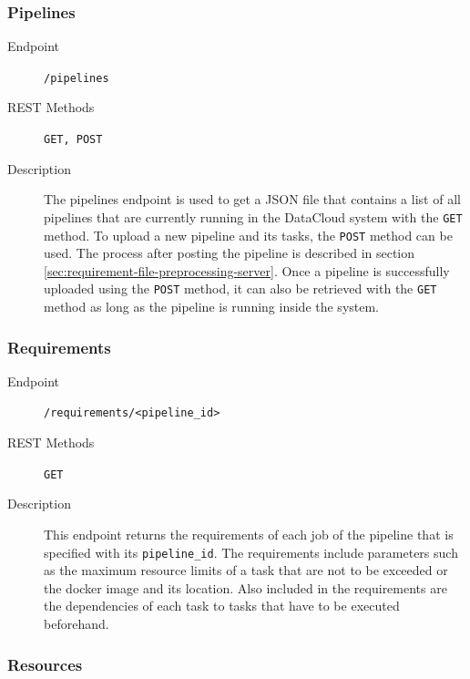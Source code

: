 \documentclass{article}
\begin{document}
            \subsubsection{Pipelines}
            
                \begin{description}
                    \item[Endpoint] \texttt{/pipelines}
                    \item[REST Methods] \texttt{GET, POST}
                    \item[Description] The pipelines endpoint is used to get a JSON file that contains a list of all pipelines that are currently running in the DataCloud system with the \texttt{GET} method. To upload a new pipeline and its tasks, the \texttt{POST} method can be used. The process after posting the pipeline is described in section \ref{sec:requirement-file-preprocessing-server}. Once a pipeline is successfully uploaded using the \texttt{POST} method, it can also be retrieved with the \texttt{GET} method as long as the pipeline is running inside the system.
                \end{description}

                
            \subsubsection{Requirements}

            \begin{description}
                \item[Endpoint] \texttt{/requirements/<pipeline\_id>}
                \item[REST Methods] \texttt{GET}
                \item[Description] This endpoint returns the requirements of each job of the pipeline that is specified with its \texttt{pipeline\_id}. The requirements include parameters such as the maximum resource limits of a task that are not to be exceeded or the docker image and its location. Also included in the requirements are the dependencies of each task to tasks that have to be executed beforehand.
            \end{description}
                
            \subsubsection{Resources}
\end{document}
